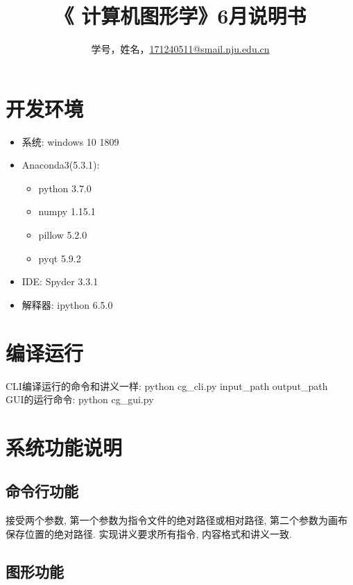 \documentclass[a4paper,UTF8]{article}
\theoremstyle{definition}
\begin{document}
\title{\textbf{《 计算机图形学》6月说明书}}
\author{学号，姓名，\href{mailto:xxx@xxx.com}{171240511@smail.nju.edu.cn}}
\maketitle

\section{开发环境}
\begin{itemize}
\item 系统: windows 10 1809
\item Anaconda3(5.3.1): 
	\begin{itemize}
		\item python 3.7.0
		\item numpy 1.15.1
		\item pillow 5.2.0
		\item pyqt 5.9.2
	\end{itemize}
\item IDE: Spyder 3.3.1
\item 解释器: ipython 6.5.0
\end{itemize}
\section{编译运行}
CLI编译运行的命令和讲义一样: python cg\_cli.py input\_path output\_path\\
\indent GUI的运行命令: python cg\_gui.py
\section{系统功能说明}
\subsection{命令行功能}
接受两个参数, 第一个参数为指令文件的绝对路径或相对路径, 第二个参数为画布保存位置的绝对路径.
实现讲义要求所有指令, 内容格式和讲义一致.
\subsection{图形功能}
\end{document}
